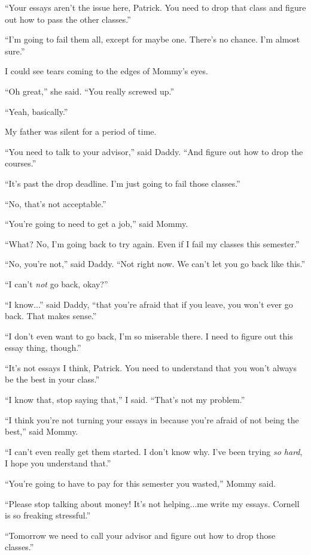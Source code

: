 ``Your essays aren't the issue here, Patrick.  You need to drop that class and
figure out how to pass the other classes.''

``I'm going to fail them all, except for maybe one.  There's no chance.  I'm
almost sure.''

I could see tears coming to the edges of Mommy's eyes.

``Oh great,'' she said.  ``You really screwed up.''

``Yeah, basically.''

My father was silent for a period of time.

``You need to talk to your advisor,'' said Daddy.  ``And figure out how to drop the
courses.''

``It's past the drop deadline.  I'm just going to fail those classes.''

``No, that's not acceptable.''

``You're going to need to get a job,'' said Mommy.

``What?  No, I'm going back to try again.  Even if I fail my classes this semester.''

``No, you're not,'' said Daddy.  ``Not right now.  We can't let you go back like this.''

``I can't \textit{not} go back, okay?''

``I know...'' said Daddy, ``that you're afraid that if you leave, you won't ever go
back.  That makes sense.''

``I don't even want to go back, I'm so miserable there.  I need to figure out
this essay thing, though.''

``It's not essays I think, Patrick.  You need to understand that you won't always be the
best in your class.''

``I know that, stop saying that,'' I said.  ``That's not my problem.''

``I think you're not turning your essays in because you're afraid of not being
the best,'' said Mommy.

``I can't even really get them started.  I don't know why.  I've been trying
\textit{so hard}, I hope you understand that.''

``You're going to have to pay for this semester you wasted,'' Mommy said.

``Please stop talking about money!  It's not helping...me write my essays.
Cornell is so freaking stressful.''

``Tomorrow we need to call your advisor and figure out how to drop those
classes.''

